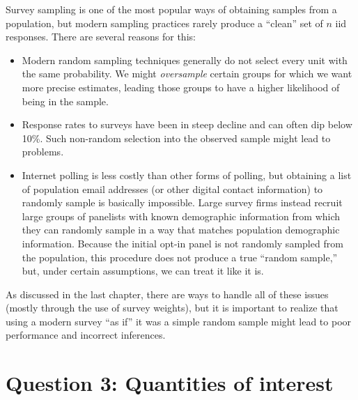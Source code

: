 \documentclass[
  13pt,
  letterpaper,
  DIV=11,
  numbers=noendperiod]{scrreprt}
\theoremstyle{plain}
\theoremstyle{definition}
\theoremstyle{definition}
\theoremstyle{remark}
\begin{document}
\begin{tcolorbox}[enhanced jigsaw, title=\textcolor{quarto-callout-warning-color}{\faExclamationTriangle}\hspace{0.5em}{Warning}, breakable, colbacktitle=quarto-callout-warning-color!10!white, toptitle=1mm, colback=white, arc=.35mm, left=2mm, opacityback=0, titlerule=0mm, colframe=quarto-callout-warning-color-frame, leftrule=.75mm, coltitle=black, opacitybacktitle=0.6, bottomtitle=1mm, rightrule=.15mm, bottomrule=.15mm, toprule=.15mm]

Survey sampling is one of the most popular ways of obtaining samples
from a population, but modern sampling practices rarely produce a
``clean'' set of \(n\) iid responses. There are several reasons for
this:

\begin{itemize}
\item
  Modern random sampling techniques generally do not select every unit
  with the same probability. We might \emph{oversample} certain groups
  for which we want more precise estimates, leading those groups to have
  a higher likelihood of being in the sample.
\item
  Response rates to surveys have been in steep decline and can often dip
  below 10\%. Such non-random selection into the observed sample might
  lead to problems.
\item
  Internet polling is less costly than other forms of polling, but
  obtaining a list of population email addresses (or other digital
  contact information) to randomly sample is basically impossible. Large
  survey firms instead recruit large groups of panelists with known
  demographic information from which they can randomly sample in a way
  that matches population demographic information. Because the initial
  opt-in panel is not randomly sampled from the population, this
  procedure does not produce a true ``random sample,'' but, under
  certain assumptions, we can treat it like it is.
\end{itemize}

As discussed in the last chapter, there are ways to handle all of these
issues (mostly through the use of survey weights), but it is important
to realize that using a modern survey ``as if'' it was a simple random
sample might lead to poor performance and incorrect inferences.

\end{tcolorbox}

\section{Question 3: Quantities of
interest}\label{question-3-quantities-of-interest}
\end{document}
